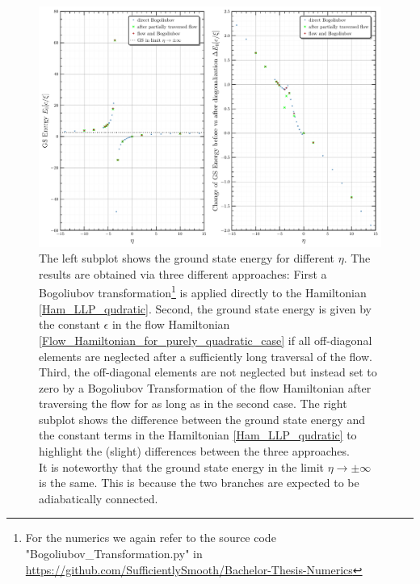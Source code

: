 \begin{figure}[H]
    \centering
    \includegraphics[width=\textwidth]{figures/plots/PDF/GS_energies_bog_flow_comp.pdf}
    \caption[Ground state energy of Bose Polaron for different $\eta$]{The left subplot shows the ground state energy for different $\eta$. The results are obtained via three different approaches: First a Bogoliubov transformation\footnote{For the numerics we again refer to the source code "Bogoliubov\_Transformation.py" in \url{https://github.com/SufficientlySmooth/Bachelor-Thesis-Numerics}} is applied directly to the Hamiltonian \ref{Ham_LLP_qudratic}. Second, the ground state energy is given by the constant $\epsilon$ in the flow Hamiltonian \ref{Flow_Hamiltonian_for_purely_quadratic_case} if all off-diagonal elements are neglected after a sufficiently long traversal of the flow. Third, the off-diagonal elements are not neglected but instead set to zero by a Bogoliubov Transformation of the flow Hamiltonian after traversing the flow for as long as in the second case.
The right subplot shows the difference between the ground state energy and the constant terms in the Hamiltonian \ref{Ham_LLP_qudratic} to highlight the (slight) differences between the three approaches.\\
It is noteworthy that the ground state energy in the limit $\eta\rightarrow\pm\infty$ is the same. This is because the two branches are expected to be adiabatically connected\cite{Grusdt_2017}. 
}
    \label{GSenergiesBogFlow}
\end{figure}
